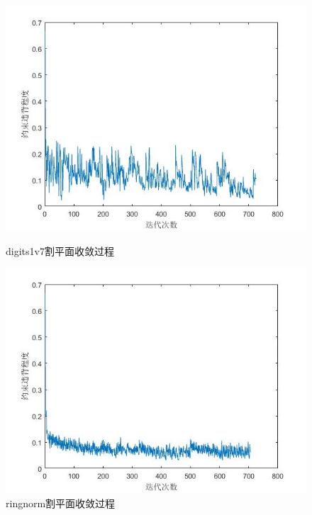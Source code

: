 \begin{figure}[H]
\begin{minipage}[t]{0.45\linewidth}
\includegraphics[width=\textwidth]{figure/digits1v7_xi.jpg}
  \caption{digits1v7割平面收敛过程}
  \label{fig:digits1v7-xi}
  \end{minipage}
  \begin{minipage}[t]{0.45\linewidth}
\includegraphics[width=\textwidth]{figure/ringnorm_xi.jpg}
  \caption{ringnorm割平面收敛过程}
  \label{fig:ringnorm-xi}
  \end{minipage}
\end{figure}

